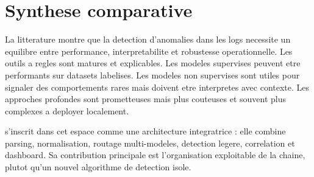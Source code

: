 \section{Synthese comparative}
La litterature montre que la detection d'anomalies dans les logs necessite un equilibre entre performance, interpretabilite et robustesse operationnelle. Les outils a regles sont matures et explicables. Les modeles supervises peuvent etre performants sur datasets labelises. Les modeles non supervises sont utiles pour signaler des comportements rares mais doivent etre interpretes avec contexte. Les approches profondes sont prometteuses mais plus couteuses et souvent plus complexes a deployer localement.

\logminer{} s'inscrit dans cet espace comme une architecture integratrice : elle combine parsing, normalisation, routage multi-modeles, detection legere, correlation et dashboard. Sa contribution principale est l'organisation exploitable de la chaine, plutot qu'un nouvel algorithme de detection isole.

